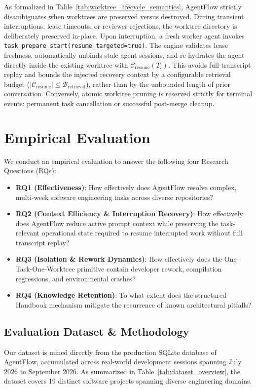 \documentclass[conference]{IEEEtran}
\begin{document}
As formalized in Table~\ref{tab:worktree_lifecycle_semantics}, AgentFlow strictly disambiguates when worktrees are preserved versus destroyed. During transient interruptions, lease timeouts, or reviewer rejections, the worktree directory is deliberately preserved in-place. Upon interruption, a fresh worker agent invokes \texttt{task\_prepare\_start(resume\_targeted=true)}. The engine validates lease freshness, automatically unbinds stale agent sessions, and re-hydrates the agent directly inside the existing worktree with $\mathcal{C}_{\text{resume}}(T_i)$. This avoids full-transcript replay and bounds the injected recovery context by a configurable retrieval budget ($|\mathcal{C}_{\text{resume}}| \leq \mathcal{B}_{\text{retrieval}}$), rather than by the unbounded length of prior conversation. Conversely, atomic worktree pruning is reserved strictly for terminal events: permanent task cancellation or successful post-merge cleanup.

\section{Empirical Evaluation}
\label{sec:eval}

We conduct an empirical evaluation to answer the following four Research Questions (RQs):
\begin{itemize}
    \item \textbf{RQ1 (Effectiveness)}: How effectively does AgentFlow resolve complex, multi-week software engineering tasks across diverse repositories?
    \item \textbf{RQ2 (Context Efficiency \& Interruption Recovery)}: How effectively does AgentFlow reduce active prompt context while preserving the task-relevant operational state required to resume interrupted work without full transcript replay?
    \item \textbf{RQ3 (Isolation \& Rework Dynamics)}: How effectively does the One-Task-One-Worktree primitive contain developer rework, compilation regressions, and environmental crashes?
    \item \textbf{RQ4 (Knowledge Retention)}: To what extent does the structured Handbook mechanism mitigate the recurrence of known architectural pitfalls?
\end{itemize}

\subsection{Evaluation Dataset \& Methodology}
Our dataset is mined directly from the production SQLite database of AgentFlow, accumulated across real-world development sessions spanning July 2026 to September 2026. As summarized in Table~\ref{tab:dataset_overview}, the dataset covers 19 distinct software projects spanning diverse engineering domains.
\end{document}
